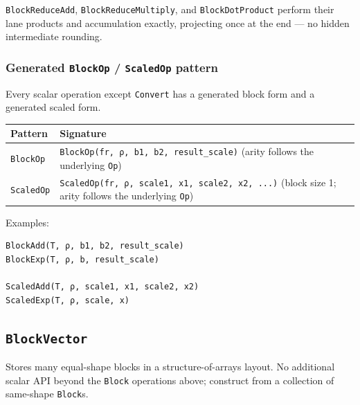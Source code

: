 \texttt{BlockReduceAdd}, \texttt{BlockReduceMultiply}, and \texttt{BlockDotProduct} perform their lane products and accumulation exactly, projecting once at the end — no hidden intermediate rounding.



\subsubsection{Generated \texttt{BlockOp} / \texttt{ScaledOp} pattern}



\label{13411109538340054149}{}


Every scalar operation except \texttt{Convert} has a generated block form and a generated scaled form.




\begin{table}[h]
\centering
\begin{tabulary}{\linewidth}{L L}
\toprule
Pattern & Signature \\
\toprule
\texttt{BlockOp} & \texttt{BlockOp(\allowbreak{}fr, ρ, b1, b2, result\_\allowbreak{}scale)} (arity follows the underlying \texttt{Op}) \\
\texttt{ScaledOp} & \texttt{ScaledOp(\allowbreak{}fr, ρ, scale1, x1, scale2, x2, ...)} (block size 1; arity follows the underlying \texttt{Op}) \\
\bottomrule
\end{tabulary}

\end{table}



Examples:




\nopagebreak[4]
\begin{verbatim}
BlockAdd(T, ρ, b1, b2, result_scale)
BlockExp(T, ρ, b, result_scale)

ScaledAdd(T, ρ, scale1, x1, scale2, x2)
ScaledExp(T, ρ, scale, x)
\end{verbatim}



\subsection{\texttt{BlockVector}}



\label{13615094720265409582-dup1}{}


Stores many equal-shape blocks in a structure-of-arrays layout. No additional scalar API beyond the \texttt{Block} operations above; construct from a collection of same-shape \texttt{Block}s.



